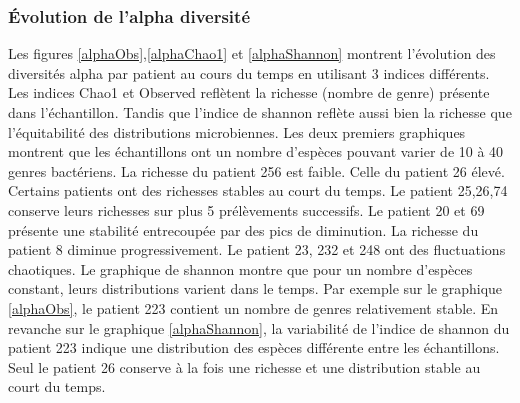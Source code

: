 \documentclass[12pt,a4paper]{article}
\begin{document}
\subsubsection{Évolution de l'alpha diversité}
Les figures \ref{alphaObs},\ref{alphaChao1} et \ref{alphaShannon} montrent l’évolution des diversités alpha par patient au cours du temps en utilisant 3 indices différents. Les indices Chao1 et Observed reflètent la richesse (nombre de genre) présente dans l’échantillon. Tandis que l’indice de shannon reflète aussi bien la richesse que l’équitabilité des distributions microbiennes.
Les deux premiers graphiques montrent que les échantillons ont un nombre d’espèces pouvant varier de 10 à 40 genres bactériens. La richesse du patient 256 est faible. Celle du patient 26 élevé.
Certains patients ont des richesses stables au court du temps. Le patient 25,26,74 conserve leurs richesses sur plus 5 prélèvements successifs. Le patient 20 et 69 présente une stabilité entrecoupée par des pics de diminution. La richesse du patient 8 diminue progressivement. Le patient 23, 232 et 248 ont des fluctuations chaotiques.
Le graphique de shannon montre que pour un nombre d’espèces constant, leurs distributions varient dans le temps. Par exemple sur le graphique \ref{alphaObs}, le patient 223 contient un nombre de genres relativement stable. En revanche sur le graphique \ref{alphaShannon}, la variabilité de l’indice de shannon du patient 223 indique une distribution des espèces différente entre les échantillons. Seul le patient 26 conserve à la fois une richesse et une distribution stable au court du temps.
\end{document}
